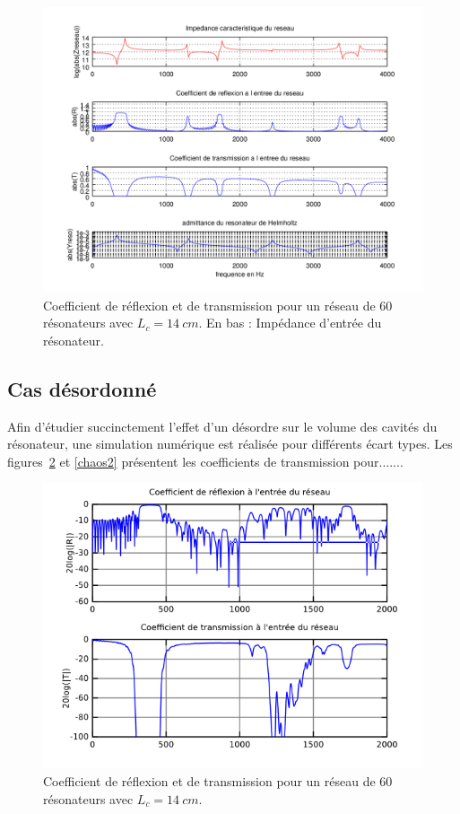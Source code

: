 \begin{figure}
\centering
\includegraphics[scale=1]{./images_chp1/ex_coef_rapport.png}
\caption{\label{ex_coef_RT} Coefficient de réflexion et de transmission pour un réseau de 60 résonateurs avec $L_c=14~cm$. En bas : Impédance d'entrée du résonateur.}
\end{figure}

\subsection{Cas désordonné}
Afin d'étudier succinctement l'effet d'un désordre sur le volume des cavités du résonateur, une simulation numérique est réalisée pour différents écart types. Les figures~\ref{chaos10} et \ref{chaos2} présentent les coefficients de transmission pour.......
\begin{figure}
	\centering
	\includegraphics[scale=1]{./images_chp1/chaos_10mm.png}
	\caption{\label{chaos10} Coefficient de réflexion et de transmission pour un réseau de 60 résonateurs avec $L_c=14~cm$.}
\end{figure}

